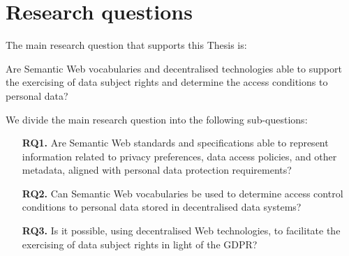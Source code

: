 \section{Research questions}
\label{sec:rqs}

The main research question that supports this Thesis is:

\begin{tcolorbox}[colback=royallavender!20]
Are Semantic Web vocabularies and decentralised technologies able to support the exercising of data subject rights and determine the access conditions to personal data?
\end{tcolorbox}

We divide the main research question into the following sub-questions:

\begin{enumerate}
    \item [\textbf{RQ1.}] Are Semantic Web standards and specifications able to represent information related to privacy preferences, data access policies, and other metadata, aligned with personal data protection requirements?
    \item [\textbf{RQ2.}] Can Semantic Web vocabularies be used to determine access control conditions to personal data stored in decentralised data systems?
    \item [\textbf{RQ3.}] Is it possible, using decentralised Web technologies, to facilitate the exercising of data subject rights in light of the GDPR?
\end{enumerate}

